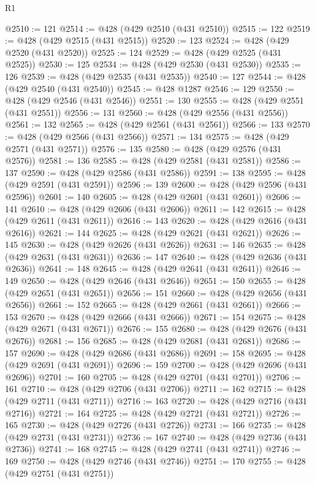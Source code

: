 \begin{lexlean}{R1}
\begin{coremodule}
@2510 := 121
@2514 := @428 (@429 @2510 (@431 @2510))
@2515 := 122
@2519 := @428 (@429 @2515 (@431 @2515))
@2520 := 123
@2524 := @428 (@429 @2520 (@431 @2520))
@2525 := 124
@2529 := @428 (@429 @2525 (@431 @2525))
@2530 := 125
@2534 := @428 (@429 @2530 (@431 @2530))
@2535 := 126
@2539 := @428 (@429 @2535 (@431 @2535))
@2540 := 127
@2544 := @428 (@429 @2540 (@431 @2540))
@2545 := @428 @1287
@2546 := 129
@2550 := @428 (@429 @2546 (@431 @2546))
@2551 := 130
@2555 := @428 (@429 @2551 (@431 @2551))
@2556 := 131
@2560 := @428 (@429 @2556 (@431 @2556))
@2561 := 132
@2565 := @428 (@429 @2561 (@431 @2561))
@2566 := 133
@2570 := @428 (@429 @2566 (@431 @2566))
@2571 := 134
@2575 := @428 (@429 @2571 (@431 @2571))
@2576 := 135
@2580 := @428 (@429 @2576 (@431 @2576))
@2581 := 136
@2585 := @428 (@429 @2581 (@431 @2581))
@2586 := 137
@2590 := @428 (@429 @2586 (@431 @2586))
@2591 := 138
@2595 := @428 (@429 @2591 (@431 @2591))
@2596 := 139
@2600 := @428 (@429 @2596 (@431 @2596))
@2601 := 140
@2605 := @428 (@429 @2601 (@431 @2601))
@2606 := 141
@2610 := @428 (@429 @2606 (@431 @2606))
@2611 := 142
@2615 := @428 (@429 @2611 (@431 @2611))
@2616 := 143
@2620 := @428 (@429 @2616 (@431 @2616))
@2621 := 144
@2625 := @428 (@429 @2621 (@431 @2621))
@2626 := 145
@2630 := @428 (@429 @2626 (@431 @2626))
@2631 := 146
@2635 := @428 (@429 @2631 (@431 @2631))
@2636 := 147
@2640 := @428 (@429 @2636 (@431 @2636))
@2641 := 148
@2645 := @428 (@429 @2641 (@431 @2641))
@2646 := 149
@2650 := @428 (@429 @2646 (@431 @2646))
@2651 := 150
@2655 := @428 (@429 @2651 (@431 @2651))
@2656 := 151
@2660 := @428 (@429 @2656 (@431 @2656))
@2661 := 152
@2665 := @428 (@429 @2661 (@431 @2661))
@2666 := 153
@2670 := @428 (@429 @2666 (@431 @2666))
@2671 := 154
@2675 := @428 (@429 @2671 (@431 @2671))
@2676 := 155
@2680 := @428 (@429 @2676 (@431 @2676))
@2681 := 156
@2685 := @428 (@429 @2681 (@431 @2681))
@2686 := 157
@2690 := @428 (@429 @2686 (@431 @2686))
@2691 := 158
@2695 := @428 (@429 @2691 (@431 @2691))
@2696 := 159
@2700 := @428 (@429 @2696 (@431 @2696))
@2701 := 160
@2705 := @428 (@429 @2701 (@431 @2701))
@2706 := 161
@2710 := @428 (@429 @2706 (@431 @2706))
@2711 := 162
@2715 := @428 (@429 @2711 (@431 @2711))
@2716 := 163
@2720 := @428 (@429 @2716 (@431 @2716))
@2721 := 164
@2725 := @428 (@429 @2721 (@431 @2721))
@2726 := 165
@2730 := @428 (@429 @2726 (@431 @2726))
@2731 := 166
@2735 := @428 (@429 @2731 (@431 @2731))
@2736 := 167
@2740 := @428 (@429 @2736 (@431 @2736))
@2741 := 168
@2745 := @428 (@429 @2741 (@431 @2741))
@2746 := 169
@2750 := @428 (@429 @2746 (@431 @2746))
@2751 := 170
@2755 := @428 (@429 @2751 (@431 @2751))

\end{coremodule}
\end{lexlean}
